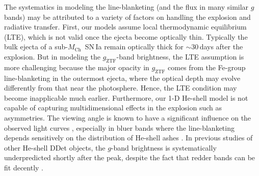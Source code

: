 \documentclass[twocolumn]{aastex631}
\newcommand{\Mch}{$M_\mathrm{Ch}$}
\begin{document}
The systematics in modeling the line-blanketing (and the flux in many similar $g$ bands) may be attributed to a variety of factors on handling the explosion and radiative transfer. First, our models assume local thermodynamic equilibrium (LTE), which is not valid once the ejecta become optically thin. Typically the bulk ejecta of a sub-\Mch\ SN\,Ia remain optically thick for $\sim$30\,days after the explosion. But in modeling the $g_\mathrm{ZTF}$-band brightness, the LTE assumption is more challenging because the major opacity in $g_\mathrm{ZTF}$ comes from the Fe-group line-blanketing in the outermost ejecta, where the optical depth may evolve differently from that near the photosphere. Hence, the LTE condition may become inapplicable much earlier. Furthermore, our 1-D He-shell model is not capable of capturing multidimensional effects in the explosion such as asymmetries. The viewing angle is known to have a significant influence on the observed light curves \citep{Kromer_DD_2010, Sim_2012, Gronow_2020, Shen_2D_2021}, especially in bluer bands where the line-blanketing depends sensitively on the distribution of He-shell ashes \citep{Shen_2D_2021}. In previous studies of other He-shell DDet objects, the $g$-band brightness is systematically underpredicted shortly after the peak, despite the fact that redder bands can be fit decently \citep[e.g.,][]{jiang_16jhr_2017,jacobson-galan_16hnk_2020}.
\end{document}
